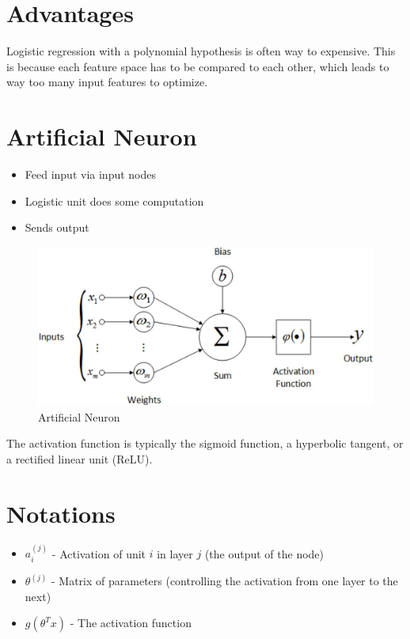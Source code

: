 \section{Advantages}
Logistic regression with a polynomial hypothesis is often way to expensive. This is because each feature space has to be compared to each other, which leads to way too many input features to optimize.

\section{Artificial Neuron}
\begin{itemize}
    \item Feed input via input nodes
    \item Logistic unit does some computation
    \item Sends output
\end{itemize}

\bigskip
\begin{figure}[H]
\centering
\includegraphics[scale=0.25]{figures/artificialneuron.jpeg}
\caption{Artificial Neuron}
\end{figure}

The activation function is typically the sigmoid function, a hyperbolic tangent, or a rectified linear unit (ReLU).

\section{Notations}
\begin{itemize}
    \item $a_i^{(j)}$ - Activation of unit $i$ in layer $j$ (the output of the node)
    \item $\theta^{(j)}$ - Matrix of parameters (controlling the activation from one layer to the next)
    \item $g(\theta^Tx)$ - The activation function
\end{itemize}

